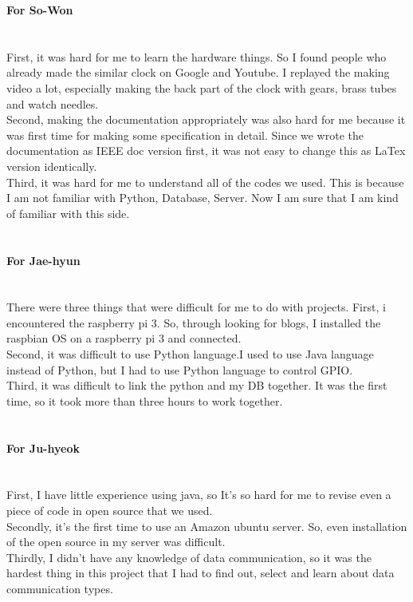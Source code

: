 \documentclass[10pt,a4paper,twocolumn]{report}
\begin{document}
   \textbf{For So-Won} \\\\\\
   \indent First, it was hard for me to learn the hardware things. So I found people who already made the similar clock on Google and Youtube. I replayed the making video a lot, especially making the back part of the clock with gears, brass tubes and watch needles. \\
\indent Second, making the documentation appropriately was also hard for me because it was first time for making some specification in detail. Since we wrote the documentation as IEEE doc version first, it was not easy to change this as LaTex version identically.  \\
\indent Third, it was hard for me to understand all of the codes we used. This is because I am not familiar with Python, Database, Server. Now I am sure that I am kind of familiar with this side. \\\\\\	

    \textbf{For Jae-hyun} \\\\\\   
    \indent There were three things that were difficult for me to do with projects. First, i encountered the raspberry pi 3. So, through looking for blogs, I installed the raspbian OS on a raspberry pi 3 and connected.  \\
\indent Second, it was difficult to use Python language.I used to use Java language instead of Python, but I had to use Python language to control GPIO.  \\
\indent Third, it was difficult to link the python and my DB together. It was the first time, so it took more than three hours to work together. \\\\\\

	\textbf{For Ju-hyeok} \\\\\\ 
	\indent First, I have little experience using java, so It's so hard for me to revise even a piece of code in open source that we used.  \\
\indent Secondly, it's the first time to use an Amazon ubuntu server. So, even installation of the open source in my server was difficult. \\
\indent Thirdly, I didn't have any knowledge of data communication, so it was the hardest thing in this project that I had to find out, select and learn about data communication types.\\\\\\
\end{document}
